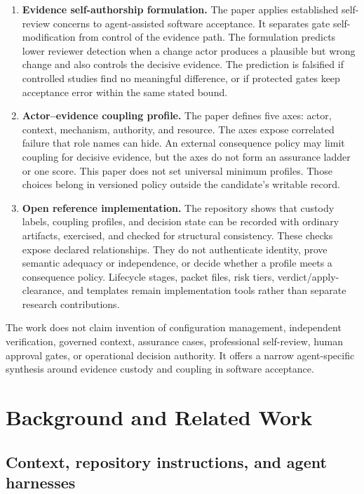 \documentclass[11pt]{article}
\begin{document}
\begin{enumerate}
  \item \textbf{Evidence self-authorship formulation.} The paper applies established self-review concerns to agent-assisted software acceptance. It separates gate self-modification from control of the evidence path. The formulation predicts lower reviewer detection when a change actor produces a plausible but wrong change and also controls the decisive evidence. The prediction is falsified if controlled studies find no meaningful difference, or if protected gates keep acceptance error within the same stated bound.
  \item \textbf{Actor--evidence coupling profile.} The paper defines five axes: actor, context, mechanism, authority, and resource. The axes expose correlated failure that role names can hide. An external consequence policy may limit coupling for decisive evidence, but the axes do not form an assurance ladder or one score. This paper does not set universal minimum profiles. Those choices belong in versioned policy outside the candidate's writable record.
  \item \textbf{Open reference implementation.} The repository shows that custody labels, coupling profiles, and decision state can be recorded with ordinary artifacts, exercised, and checked for structural consistency. These checks expose declared relationships. They do not authenticate identity, prove semantic adequacy or independence, or decide whether a profile meets a consequence policy. Lifecycle stages, packet files, risk tiers, verdict/apply-clearance, and templates remain implementation tools rather than separate research contributions.
\end{enumerate}

The work does not claim invention of configuration management, independent verification, governed context, assurance cases, professional self-review, human approval gates, or operational decision authority. It offers a narrow agent-specific synthesis around evidence custody and coupling in software acceptance.

\section{Background and Related Work}
\label{sec:related}

\subsection{Context, repository instructions, and agent harnesses}
\end{document}
